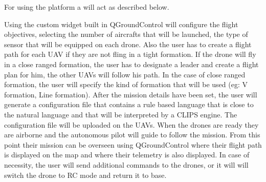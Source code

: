 For using the platform a will act as described below.

Using the custom widget built in QGroundControl will configure the flight objectives, 
selecting the number of aircrafts that will be launched, the type of sensor that
will be equipped on each drone. Also the user has to create a flight path for 
each UAV if they are not fling in a tight formation. If the drone will fly in 
a close ranged formation, the user has to designate a leader and create a flight
plan for him, the other UAVs will follow his path. In the case of close ranged 
formation, the user will specify the kind of formation that will be used (eg: 
  V formation, Line formation). After the mission details have been set, the user
will generate a configuration file that contains a rule based language that
is close to the natural language and that will be interpreted by a CLIPS engine.
The configuration file will be uploaded on the UAVs. When the drones are ready
they are airborne and the autonomous pilot will guide to follow the mission.
From this point their mission can be overseen using QGroundControl where their
flight path is displayed on the map and where their telemetry is also displayed.
In case of necessity, the user will send additional commands to the drones, or
it will will switch the drone to RC mode and return it to base.

